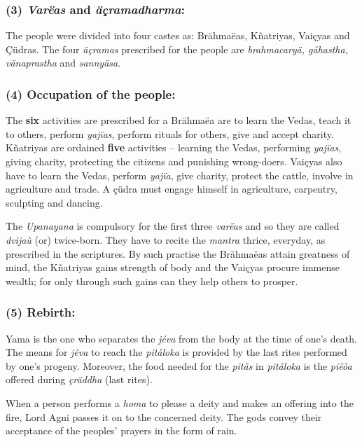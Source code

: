 \subsubsection*{(3) \textit{Varëas} and \textit{äçramadharma}:}

The people were divided into four castes as: Brähmaëas, Kñatriyas, Vaiçyas and Çüdras. The four \textit{äçramas} prescribed for the people are \textit{brahmacaryä, gåhastha, vänaprastha} and \textit{sannyäsa}.


\subsubsection*{(4) Occupation of the people:}

The \textbf{six} activities are prescribed for a Brähmaëa are to learn the Vedas, teach it to others, perform \textit{yajïas}, perform rituals for others, give and accept charity. Kñatriyas are ordained \textbf{five} activities – learning the Vedas, performing \textit{yajïas}, giving charity, protecting the citizens and punishing wrong-doers. Vaiçyas also have to learn the Vedas, perform \textit{yajïa}, give charity, protect the cattle, involve in agriculture and trade. A çüdra must engage himself in agriculture, carpentry, sculpting and dancing.

The \textit{Upanayana} is compulsory for the first three \textit{varëas} and so they are called \textit{dvijaù} (or) twice-born. They have to recite the \textit{mantra} thrice, everyday, as prescribed in the scriptures. By such practise the Brähmaëas attain greatness of mind, the Kñatriyas gains strength of body and the Vaiçyas procure immense wealth; for only through such gains can they help others to prosper.


\subsubsection*{(5) Rebirth:}

Yama is the one who separates the \textit{jéva} from the body at the time of one’s death. The means for \textit{jéva} to reach the \textit{pitåloka} is provided by the last rites performed by one’s progeny. Moreover, the food needed for the \textit{pitås} in \textit{pitåloka} is the \textit{piëòa} offered during \textit{çräddha} (last rites).

When a person performs a \textit{homa} to please a deity and makes an offering into the fire, Lord Agni passes it on to the concerned deity. The gods convey their acceptance of the peoples’ prayers in the form of rain.


